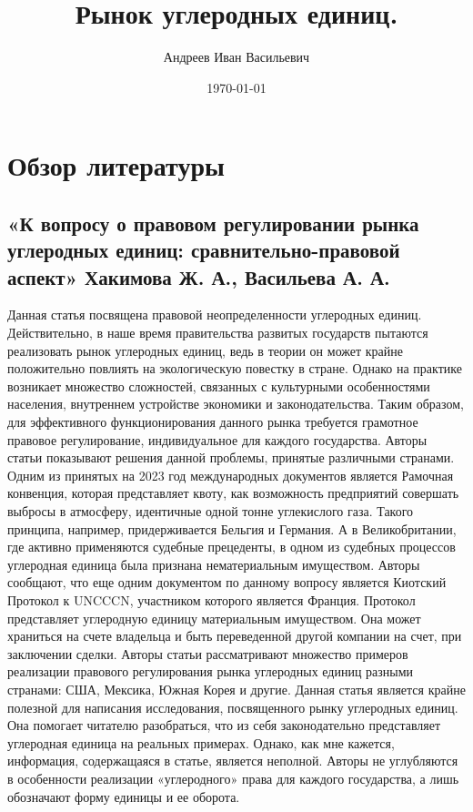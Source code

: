 \documentclass[a4paper,14pt]{article}
\author{Андреев Иван Васильевич}
\title{Рынок углеродных единиц.}
\date{\today}
\begin{document}
\maketitle

\section{Обзор литературы}
    \subsection{«К вопросу о правовом регулировании рынка углеродных единиц: сравнительно-правовой аспект» Хакимова Ж. А., Васильева А. А.}
    Данная статья посвящена правовой неопределенности углеродных единиц. Действительно, в наше время правительства развитых государств пытаются реализовать рынок углеродных единиц, ведь в теории он может крайне положительно повлиять на экологическую повестку в стране. Однако на практике возникает множество сложностей, связанных с культурными особенностями населения, внутреннем устройстве экономики и законодательства. Таким образом, для эффективного функционирования данного рынка требуется грамотное правовое регулирование, индивидуальное для каждого государства. Авторы статьи показывают решения данной проблемы, принятые различными странами. Одним из принятых на 2023 год международных документов является Рамочная конвенция, которая представляет квоту, как возможность предприятий совершать выбросы в атмосферу, идентичные одной тонне углекислого газа. Такого принципа, например, придерживается Бельгия и Германия. А в Великобритании, где активно применяются судебные прецеденты, в одном из судебных процессов углеродная единица была признана нематериальным имуществом. Авторы сообщают, что еще одним документом по данному вопросу является Киотский Протокол к UNCCCN, участником которого является Франция. Протокол представляет углеродную единицу материальным имуществом. Она может храниться на счете владельца и быть переведенной другой компании на счет, при заключении сделки. Авторы статьи рассматривают множество примеров реализации правового регулирования рынка углеродных единиц разными странами: США, Мексика, Южная Корея и другие. Данная статья является крайне полезной для написания исследования, посвященного рынку углеродных единиц. Она помогает читателю разобраться, что из себя законодательно представляет углеродная единица на реальных примерах. Однако, как мне кажется, информация, содержащаяся в статье, является неполной. Авторы не углубляются в особенности реализации «углеродного» права для каждого государства, а лишь обозначают форму единицы и ее оборота.
\end{document}
